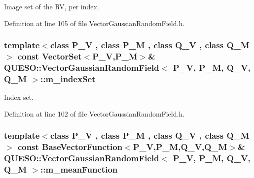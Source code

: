 Image set of the R\-V, per index. 



Definition at line 105 of file Vector\-Gaussian\-Random\-Field.\-h.

\hypertarget{class_q_u_e_s_o_1_1_vector_gaussian_random_field_a3b4453419ff7b6e593b2f6cc88830490}{
\subsubsection[{m\-\_\-index\-Set}]{\setlength{\rightskip}{0pt plus 5cm}template$<$class P\-\_\-\-V , class P\-\_\-\-M , class Q\-\_\-\-V , class Q\-\_\-\-M $>$ const {\bf Vector\-Set}$<$P\-\_\-\-V,P\-\_\-\-M$>$\& {\bf Q\-U\-E\-S\-O\-::\-Vector\-Gaussian\-Random\-Field}$<$ P\-\_\-\-V, P\-\_\-\-M, Q\-\_\-\-V, Q\-\_\-\-M $>$\-::m\-\_\-index\-Set\hspace{0.3cm}{\ttfamily [protected]}}}\label{class_q_u_e_s_o_1_1_vector_gaussian_random_field_a3b4453419ff7b6e593b2f6cc88830490}


Index set. 



Definition at line 102 of file Vector\-Gaussian\-Random\-Field.\-h.

\hypertarget{class_q_u_e_s_o_1_1_vector_gaussian_random_field_a648031ddf7e3d5d4d0eb353edc52b4bc}{
\subsubsection[{m\-\_\-mean\-Function}]{\setlength{\rightskip}{0pt plus 5cm}template$<$class P\-\_\-\-V , class P\-\_\-\-M , class Q\-\_\-\-V , class Q\-\_\-\-M $>$ const {\bf Base\-Vector\-Function}$<$P\-\_\-\-V,P\-\_\-\-M,Q\-\_\-\-V,Q\-\_\-\-M$>$\& {\bf Q\-U\-E\-S\-O\-::\-Vector\-Gaussian\-Random\-Field}$<$ P\-\_\-\-V, P\-\_\-\-M, Q\-\_\-\-V, Q\-\_\-\-M $>$\-::m\-\_\-mean\-Function\hspace{0.3cm}{\ttfamily [protected]}}}\label{class_q_u_e_s_o_1_1_vector_gaussian_random_field_a648031ddf7e3d5d4d0eb353edc52b4bc}


